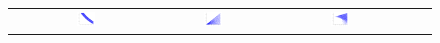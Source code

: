 \documentclass{article}
\newcommand{\nn}{0.16}
\begin{document}
\begin{figure}[t!]
\begin{center}
\begin{tabular}{cccccc}
& \hspace{-3mm} \includegraphics[width=\nn\textwidth]{Figs/col_m1v1_when_p_is_3_and_v2_is_0_dot_2.png}
& \hspace{-3mm} \includegraphics[width=\nn\textwidth]{Figs/col_v1v2.png}
& \hspace{-3mm} \includegraphics[width=\nn\textwidth]{Figs/col_v1v2whenPis3.png}

\end{tabular}
\end{center}
\end{figure}
\end{document}
